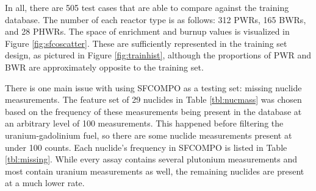 In all, there are 505 test cases that are able to compare against the training
database.  The number of each reactor type is as follows: 312 \glspl{PWR}, 165
\glspl{BWR}, and 28 \glspl{PHWR}. The space of enrichment and burnup values
is visualized in Figure \ref{fig:sfcoscatter}. These are sufficiently
represented in the training set design, as pictured in Figure
\ref{fig:trainhist}, although the proportions of \gls{PWR} and \gls{BWR} are
approximately opposite to the training set. 

There is one main issue with using \gls{SFCOMPO} as a testing set: missing
nuclide measurements.  The feature set of 29 nuclides in Table
\ref{tbl:nucmass} was chosen based on the frequency of these measurements being
present in the database at an arbitrary level of 100 measurements. This
happened before filtering the uranium-gadolinium fuel, so there are some
nuclide measurements present at under 100 counts.  Each nuclide's frequency in
\gls{SFCOMPO} is listed in Table \ref{tbl:missing}.  While every assay contains
several plutonium measurements and most contain uranium measurements as well,
the remaining nuclides are present at a much lower rate. 

